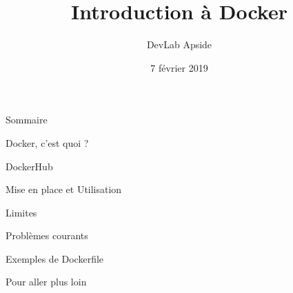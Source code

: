 \documentclass{beamer}
\title{Introduction à Docker}
\subtitle{DevLab Apside}
\date{7 février 2019}
\begin{document}
\begin{frame}
  \titlepage
\end{frame}

\begin{frame}{Sommaire}
\tableofcontents
\end{frame}

\begin{section}{Docker, c'est quoi ?}

\end{section}

\begin{section}{DockerHub}

\end{section}

\begin{section}{Mise en place et Utilisation}

\end{section}
\begin{section}{Limites}

\end{section}
\begin{section}{Problèmes courants}

\end{section}
\begin{section}{Exemples de Dockerfile}

\end{section}

\begin{section}{Pour aller plus loin}



\end{section}
\end{document}
